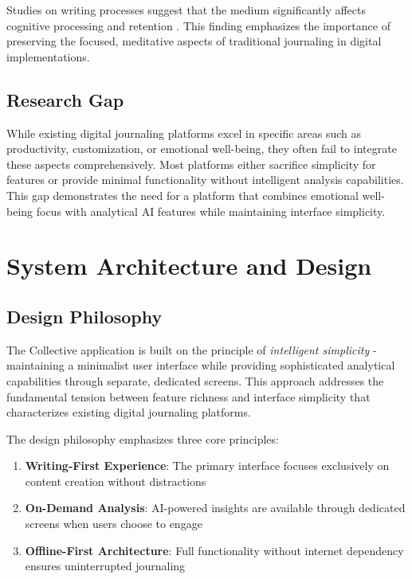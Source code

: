 \documentclass[conference]{IEEEtran}
\begin{document}
{\begin{IEEEkeywords}
Studies on writing processes suggest that the medium significantly affects cognitive processing and retention \cite{mueller2014pen}. This finding emphasizes the importance of preserving the focused, meditative aspects of traditional journaling in digital implementations.

\subsection{Research Gap}

While existing digital journaling platforms excel in specific areas such as productivity, customization, or emotional well-being, they often fail to integrate these aspects comprehensively. Most platforms either sacrifice simplicity for features or provide minimal functionality without intelligent analysis capabilities. This gap demonstrates the need for a platform that combines emotional well-being focus with analytical AI features while maintaining interface simplicity.

\section{System Architecture and Design}

\subsection{Design Philosophy}

The Collective application is built on the principle of \textit{intelligent simplicity} - maintaining a minimalist user interface while providing sophisticated analytical capabilities through separate, dedicated screens. This approach addresses the fundamental tension between feature richness and interface simplicity that characterizes existing digital journaling platforms.

The design philosophy emphasizes three core principles:
\begin{enumerate}
\item \textbf{Writing-First Experience}: The primary interface focuses exclusively on content creation without distractions
\item \textbf{On-Demand Analysis}: AI-powered insights are available through dedicated screens when users choose to engage
\item \textbf{Offline-First Architecture}: Full functionality without internet dependency ensures uninterrupted journaling
\end{enumerate}


\end{IEEEkeywords}}
\end{document}
